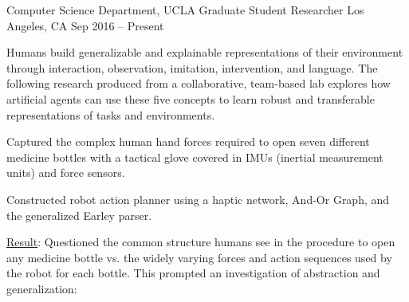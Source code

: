 


\begin{cventries}



\cventry
{Computer Science Department, UCLA}
{Graduate Student Researcher}
{Los Angeles, CA}
{Sep 2016 – Present}
{
\begin{justify}
Humans build generalizable and explainable representations of their environment through interaction, observation, imitation, intervention, and language. The following research produced from a collaborative, team-based lab explores how artificial agents can use these five concepts to learn robust and transferable representations of tasks and environments.
\end{justify}
%
\begin{justify}
\end{justify}
\vspace{-1mm}
\begin{cvitems}
  \item Captured the complex human hand forces required to open seven different medicine bottles with a tactical glove covered in IMUs (inertial measurement units) and force sensors.
  \item Constructed robot action planner using a haptic network, And-Or Graph, and the generalized Earley parser.
  \item \underline{Result}: Questioned the common structure humans see in the procedure to open any medicine bottle vs. the widely varying forces and action sequences used by the robot for each bottle. This prompted an investigation of abstraction and generalization:
\end{cvitems}
%
\begin{justify}

\end{justify}}
\end{cventries}
